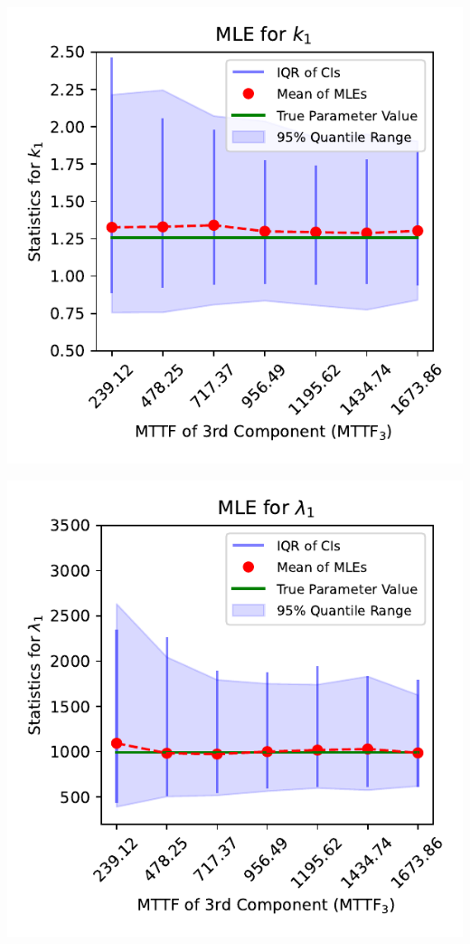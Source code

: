 \documentclass{article}
\begin{document}
\pagestyle{empty}

\noindent
\begin{minipage}[t]{0.45\textwidth}
  \centering
  \includegraphics[width=\textwidth,height=0.33\textheight,keepaspectratio]{plot-mttf3-vs-shape.1.pdf}
\end{minipage}%
\hspace{0.05\textwidth} %
\begin{minipage}[t]{0.45\textwidth}
  \centering
  \includegraphics[width=\textwidth,height=0.33\textheight,keepaspectratio]{plot-mttf3-vs-scale.1.pdf}
\end{minipage}
\end{document}
